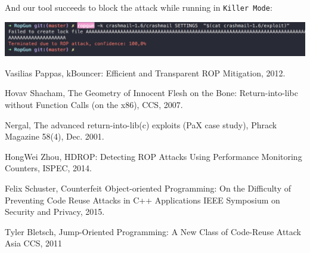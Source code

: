 \documentclass[11pt]{article}
\begin{document}
And our tool succeeds to block the attack while running in {\tt Killer Mode}:

\begin{center}
  \includegraphics[width=0.9\linewidth]{killer}
\end{center}
\newpage


\begin{thebibliography}{99}
    Vasilias Pappas,
    kBouncer: Efficient and Transparent ROP Mitigation,
    2012.

      Hovav Shacham,
      The Geometry of Innocent Flesh on the Bone: Return-into-libc without Function Calls (on the x86),
      CCS,
      2007.

    Nergal,
    The advanced return-into-lib(c) exploits (PaX case study),
    Phrack Magazine 58(4),
    Dec. 2001.

    HongWei Zhou,
    HDROP: Detecting ROP Attacks Using Performance Monitoring Counters,
    ISPEC,
    2014.

    Felix Schuster,
    Counterfeit Object-oriented Programming: On the Difficulty of Preventing Code Reuse Attacks in C++ Applications
    IEEE Symposium on Security and Privacy,
    2015.

    Tyler Bletsch,
    Jump-Oriented Programming: A New Class of Code-Reuse Attack
    Asia CCS,
    2011



\end{thebibliography}
\end{document}
